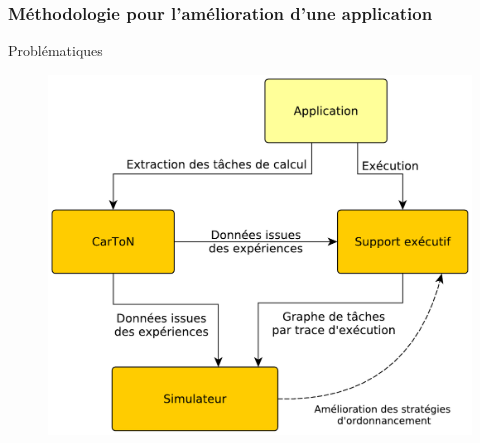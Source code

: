\documentclass[xcolor={usenames,dvipsnames,svgnames,table}, aspectratio=43]{beamer}
\begin{document}
\begin{frame}
  \frametitle{Méthodologie pour l'amélioration d'une application}
  \begin{minipage}[t]{0.36\linewidth}
    \begin{block}{Problématiques}
      \begin{itemize}
      \end{itemize}
    \end{block}
  \end{minipage}
      \hfill
  \begin{minipage}[t]{0.60\linewidth}
    \begin{figure}
       {%
	\includegraphics[width=\textwidth]{graph/big_picture.pdf}%
      }%
       {%
}
\end{figure}
\end{minipage}
\end{frame}
\end{document}
